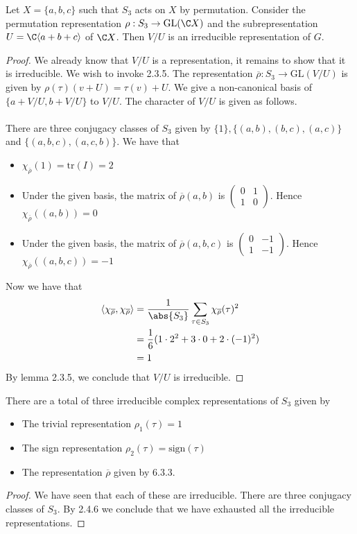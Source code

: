 \documentclass[a4paper]{article}
\begin{document}
\begin{prp}{}{} Let $X=\{a,b,c\}$ such that $S_3$ acts on $X$ by permutation. Consider the permutation representation $\rho:S_3\to\text{GL}(\C X)$ and the subrepresentation $U=\C\langle a+b+c\rangle$ of $\C X$. Then $V/U$ is an irreducible representation of $G$. \tcbline
\begin{proof}
We already know that $V/U$ is a representation, it remains to show that it is irreducible. We wish to invoke 2.3.5. The representation $\overline{\rho}:S_3\to\text{GL}(V/U)$ is given by $\rho(\tau)(v+U)=\tau(v)+U$. We give a non-canonical basis of $\{a+V/U,b+V/U\}$ to $V/U$. The character of $V/U$ is given as follows. \\~\\

There are three conjugacy classes of $S_3$ given by $\{1\},\{(a,b),(b,c),(a,c)\}$ and $\{(a,b,c),(a,c,b)\}$. We have that 
\begin{itemize}
\item $\chi_{\overline{\rho}}(1)=\text{tr}(I)=2$
\item Under the given basis, the matrix of $\overline{\rho}(a,b)$ is $\begin{pmatrix}
0 & 1\\
1 & 0
\end{pmatrix}$. Hence $\chi_{\overline{\rho}}((a,b))=0$
\item Under the given basis, the matrix of $\overline{\rho}(a,b,c)$ is $\begin{pmatrix}
0 & -1\\
1 & -1
\end{pmatrix}$. Hence $\chi_{\overline{\rho}}((a,b,c))=-1$
\end{itemize}
Now we have that 
\begin{align*}
\langle\chi_{\overline{\rho}},\chi_{\overline{\rho}}\rangle&=\frac{1}{\abs{S_3}}\sum_{\tau\in S_3}\chi_{\overline{\rho}}(\tau)^2\\
&=\frac{1}{6}(1\cdot 2^2+3\cdot 0+2\cdot(-1)^2)\\
&=1
\end{align*}
By lemma 2.3.5, we conclude that $V/U$ is irreducible. 
\end{proof}
\end{prp}

\begin{thm}{}{} There are a total of three irreducible complex representations of $S_3$ given by 
\begin{itemize}
\item The trivial representation $\rho_1(\tau)=1$
\item The sign representation $\rho_2(\tau)=\text{sign}(\tau)$
\item The representation $\overline{\rho}$ given by 6.3.3. 
\end{itemize} \tcbline
\begin{proof}
We have seen that each of these are irreducible. There are three conjugacy classes of $S_3$. By 2.4.6 we conclude that we have exhausted all the irreducible representations. 
\end{proof}
\end{thm}
\end{document}
